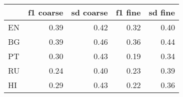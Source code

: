 \begin{tabular}{lrrrr}
\toprule
 & f1 coarse & sd coarse & f1 fine & sd fine \\
\midrule
EN & 0.39 & 0.42 & 0.32 & 0.40 \\
BG & 0.39 & 0.46 & 0.36 & 0.44 \\
PT & 0.30 & 0.43 & 0.19 & 0.34 \\
RU & 0.24 & 0.40 & 0.23 & 0.39 \\
HI & 0.29 & 0.43 & 0.22 & 0.36 \\
\bottomrule
\end{tabular}
